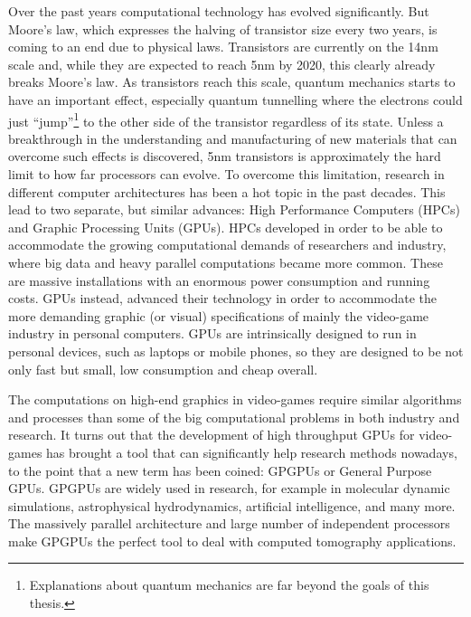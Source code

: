 Over the past years computational technology has evolved significantly. But Moore's law, which expresses the halving of transistor size every two years, is coming to an end due to physical laws. Transistors  are currently on the 14nm scale and, while they are expected to reach 5nm by 2020, this clearly already breaks Moore's law. As transistors reach this scale, quantum mechanics starts to have an important effect, especially quantum tunnelling where the electrons could just ``jump''\footnote{Explanations about quantum mechanics are far beyond the goals of this thesis.} to the other side of the transistor regardless of its state. Unless a breakthrough in the understanding and manufacturing of new materials that can overcome such effects is discovered, 5nm transistors is approximately the hard limit to how far processors can evolve. To overcome this limitation, research in different computer architectures has been a hot topic in the past decades. This lead to two separate, but similar advances: High Performance Computers (HPCs) and Graphic Processing Units (GPUs). HPCs developed in order to be able to accommodate the growing computational demands of researchers and industry, where big data and heavy parallel computations became more common. These are massive installations with an enormous power consumption and running costs. GPUs instead, advanced their technology in order to accommodate the more demanding graphic (or visual) specifications of mainly the video-game industry in personal computers. GPUs are intrinsically designed to run in personal devices, such as laptops or mobile phones, so they are designed to be not only fast but small, low consumption and cheap overall.

The computations on high-end graphics in video-games require similar algorithms and processes than some of the big computational problems in both industry and research. It turns out that the development of high throughput GPUs for video-games has brought a tool that can significantly help research methods nowadays, to the point that a new term has been coined: GPGPUs or General Purpose GPUs. GPGPUs are widely used in research, for example in molecular dynamic simulations\cite{phillips2005scalable}, astrophysical hydrodynamics\cite{CHOLLA}, artificial intelligence\cite{Tensorflow}, and many more. The massively parallel architecture and large number of independent processors make GPGPUs the perfect tool to deal with computed tomography applications.

